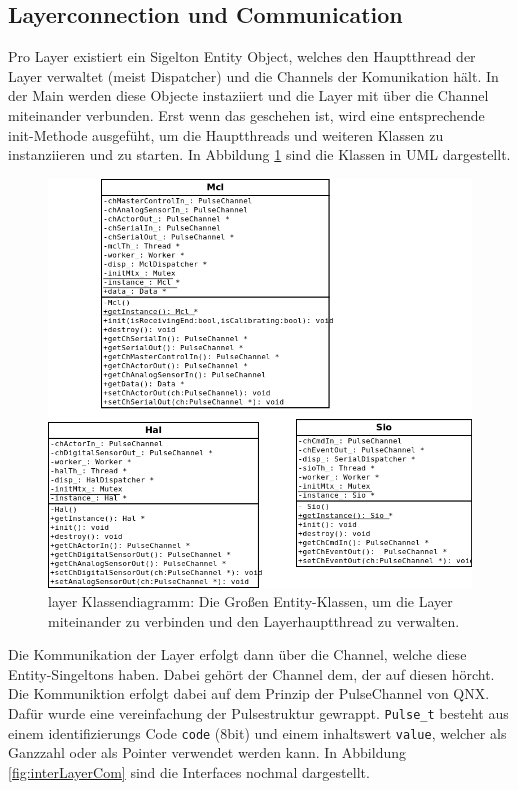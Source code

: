 \documentclass[
   draft=false
  ,paper=a4
  ,twoside=true
  ,fontsize=11pt
  ,headsepline
  ,DIV11
  ,parskip=full+
]{scrartcl} %
\begin{document}
  
\subsection{Layerconnection und Communication}
Pro Layer existiert ein Sigelton Entity Object, welches den Hauptthread der Layer verwaltet (meist Dispatcher) und die Channels der Komunikation hält.
In der Main werden diese Objecte instaziiert und die Layer mit über die Channel miteinander verbunden. Erst wenn das geschehen ist, wird eine entsprechende init-Methode ausgefüht, um die Hauptthreads und weiteren Klassen zu instanziieren und zu starten. In Abbildung \ref{fig:layer} sind die Klassen in UML dargestellt. 
\begin{figure}[htp]
  	\centering
    \includegraphics[width=\textwidth]{./IMG/layer.png}
    \caption[layer]{layer Klassendiagramm: Die Großen Entity-Klassen, um die Layer miteinander zu verbinden und den Layerhauptthread zu verwalten.}
     \label{fig:layer}
\end{figure}
\newline
Die Kommunikation der Layer erfolgt dann über die Channel, welche diese Entity-Singeltons haben. Dabei gehört der Channel dem, der auf diesen hörcht.
Die Kommuniktion erfolgt dabei auf dem Prinzip der PulseChannel von QNX. Dafür wurde eine vereinfachung der Pulsestruktur gewrappt. \texttt{Pulse\_t} besteht aus einem identifizierungs Code \texttt{code} (8bit) und einem inhaltswert \texttt{value}, welcher als Ganzzahl oder als Pointer verwendet werden kann. In Abbildung \ref{fig:interLayerCom} sind die Interfaces nochmal dargestellt.
\end{document}
